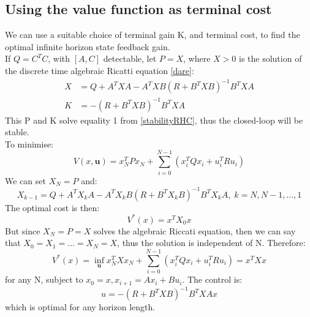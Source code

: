 \documentclass{article}
\begin{document}
\subsection{Using the value function as terminal cost}
We can use a suitable choice of terminal gain K, and terminal cost, to find the optimal infinite horizon state feedback gain. \\
If $Q = C^TC$, with $[A,C]$ detectable, let $P = X$, where $X > 0$ is the solution of the discrete time algebraic Ricatti equation \eqref{dare}:
\[
\begin{aligned}
X &= Q+ A^TXA - A^TXB(R+B^TXB)^{-1}B^TXA \\
K &= -(R+B^TXB)^{-1}B^TXA
\end{aligned}
\]
This P and K solve equality 1 from \eqref{stabilityRHC}, thus the closed-loop will be stable. \\
To minimise:
\[
V(x,\textbf{u}) = x_N^TPx_N + \sum_{i=0}^{N-1}(x_i^TQx_i + u_i^TR u_i)
\]
We can set $X_N = P$ and:
\[
X_{k-1} = Q + A^TX_kA - A^TX_kB(R+B^TX_kB)^{-1}B^TX_kA, \; k=N,N-1,\hdots,1
\]
The optimal cost is then:
\[
V^*(x) = x^TX_0x
\]
But since $X_N=P=X$ solves the algebraic Riccati equation, then we can say that $X_0 = X_1 = ... = X_N = X$, thus the solution is independent of N. Therefore:
\[
V^*(x) = \inf_\textbf{u} x_N^TXx_N + \sum_{i=0}^{N-1} (x_i^TQx_i + u_i^TR u_i) = x^TXx
\]
for any N, subject to $x_0 = x, x_{i+1} = Ax_i + Bu_i$. The control is:
\[
u =  -(R + B^TXB)^{-1}B^TXAx
\]
which is optimal for any horizon length.
\end{document}
